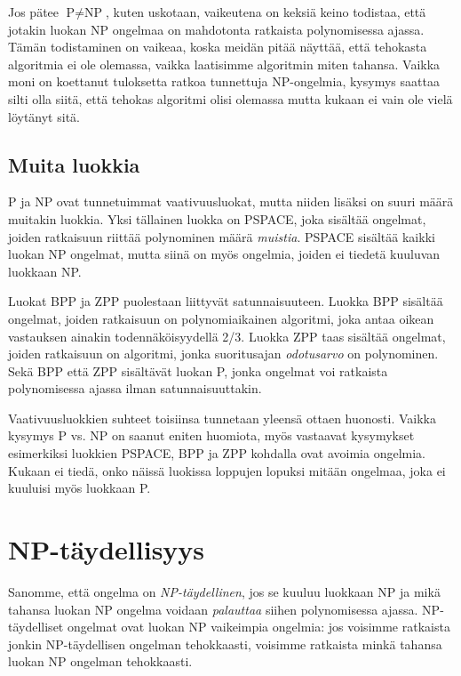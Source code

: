 Jos pätee $\textrm{P} \neq \textrm{NP}$, kuten uskotaan,
vaikeutena on keksiä keino todistaa, että jotakin
luokan NP ongelmaa on mahdotonta ratkaista
polynomisessa ajassa.
Tämän todistaminen on vaikeaa, koska meidän pitää näyttää,
että tehokasta algoritmia ei ole olemassa,
vaikka laatisimme algoritmin miten tahansa.
Vaikka moni on koettanut tuloksetta ratkoa
tunnettuja NP-ongelmia, kysymys saattaa silti olla siitä,
että tehokas algoritmi olisi olemassa mutta kukaan ei
vain ole vielä löytänyt sitä.

\subsection{Muita luokkia}


P ja NP ovat tunnetuimmat vaativuusluokat,
mutta niiden lisäksi on suuri määrä muitakin luokkia.
Yksi tällainen luokka on PSPACE,
joka sisältää ongelmat, joiden ratkaisuun riittää
polynominen määrä \emph{muistia}.
PSPACE sisältää kaikki luokan NP ongelmat,
mutta siinä on myös ongelmia,
joiden ei tiedetä kuuluvan luokkaan NP.


Luokat BPP ja ZPP puolestaan liittyvät satunnaisuuteen.
Luokka BPP sisältää ongelmat, joiden ratkaisuun on polynomiaikainen algoritmi,
joka antaa oikean vastauksen ainakin todennäköisyydellä 2/3.
Luokka ZPP taas sisältää ongelmat, joiden ratkaisuun on algoritmi,
jonka suoritusajan \emph{odotusarvo} on polynominen.
Sekä BPP että ZPP sisältävät luokan P, jonka ongelmat
voi ratkaista polynomisessa ajassa ilman satunnaisuuttakin.

Vaativuusluokkien suhteet toisiinsa tunnetaan yleensä ottaen huonosti.
Vaikka kysymys P vs. NP on saanut eniten huomiota,
myös vastaavat kysymykset esimerkiksi luokkien PSPACE, BPP ja ZPP
kohdalla ovat avoimia ongelmia.
Kukaan ei tiedä, onko näissä luokissa loppujen lopuksi mitään ongelmaa,
joka ei kuuluisi myös luokkaan P.

\section{NP-täydellisyys}


Sanomme, että ongelma on \emph{NP-täydellinen},
jos se kuuluu luokkaan NP ja mikä tahansa luokan NP
ongelma voidaan \emph{palauttaa} siihen polynomisessa ajassa.
NP-täydelliset ongelmat ovat luokan NP vaikeimpia ongelmia:
jos voisimme ratkaista jonkin NP-täydellisen ongelman tehokkaasti,
voisimme ratkaista minkä tahansa luokan NP ongelman tehokkaasti.

